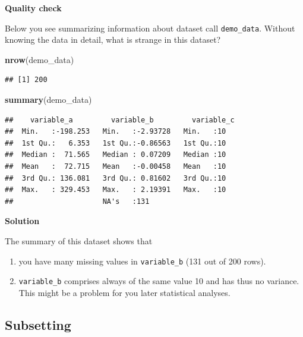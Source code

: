 \documentclass[
]{scrartcl}
\makeatletter
\newenvironment{Shaded}{\begin{snugshade}}{\end{snugshade}}
\newcommand{\FunctionTok}[1]{\textcolor[rgb]{0.13,0.29,0.53}{\textbf{#1}}}
\newcommand{\NormalTok}[1]{#1}
\providecommand{\tightlist}{%
  \setlength{\itemsep}{0pt}\setlength{\parskip}{0pt}}
\newenvironment{kframe}{%
\medskip{}
\setlength{\fboxsep}{.8em}
 \def\at@end@of@kframe{}%
 \ifinner\ifhmode%
  \def\at@end@of@kframe{\end{minipage}}%
  \begin{minipage}{\columnwidth}%
 \fi\fi%
 \def\FrameCommand##1{\hskip\@totalleftmargin \hskip-\fboxsep
 \colorbox{shadecolor}{##1}\hskip-\fboxsep
     \hskip-\linewidth \hskip-\@totalleftmargin \hskip\columnwidth}%
 \MakeFramed {\advance\hsize-\width
   \@totalleftmargin\z@ \linewidth\hsize
   \@setminipage}}%
 {\par\unskip\endMakeFramed%
 \at@end@of@kframe}
\newenvironment{rmdblock}[1]
  {
  \begin{itemize}
  \renewcommand{\labelitemi}{
    \raisebox{-.7\height}[0pt][0pt]{
      {\setkeys{Gin}{width=3em,keepaspectratio}\texttt{[image: images/\#1]}}
    }
  }
  \setlength{\fboxsep}{1em}
  \begin{kframe}
  \item
  }
  {
  \end{kframe}
  \end{itemize}
  }
\newenvironment{myexercise}
    {\begin{rmdblock}{exercise_green}}
    {\end{rmdblock}}
\newenvironment{webexsolution}[1]
    {\par\tiny\textbf{#1}}
    {\par}
\newcommand{\webexhide}[1]{\begin{webexsolution}{#1}}
\newcommand{\webexunhide}{\end{webexsolution}}
\makeatother
\begin{document}
\begin{myexercise}
\textbf{Quality check}

Below you see summarizing information about dataset call
\texttt{demo\_data}. Without knowing the data in detail, what is strange
in this dataset?
\end{myexercise}

\begin{Shaded}
\begin{Highlighting}[]
\FunctionTok{nrow}\NormalTok{(demo\_data)}
\end{Highlighting}
\end{Shaded}

\begin{verbatim}
## [1] 200
\end{verbatim}

\begin{Shaded}
\begin{Highlighting}[]
\FunctionTok{summary}\NormalTok{(demo\_data)}
\end{Highlighting}
\end{Shaded}

\begin{verbatim}
##    variable_a         variable_b         variable_c
##  Min.   :-198.253   Min.   :-2.93728   Min.   :10  
##  1st Qu.:   6.353   1st Qu.:-0.86563   1st Qu.:10  
##  Median :  71.565   Median : 0.07209   Median :10  
##  Mean   :  72.715   Mean   :-0.00458   Mean   :10  
##  3rd Qu.: 136.081   3rd Qu.: 0.81602   3rd Qu.:10  
##  Max.   : 329.453   Max.   : 2.19391   Max.   :10  
##                     NA's   :131
\end{verbatim}

\webexhide{Solution}

The summary of this dataset shows that

\begin{enumerate}
\def\labelenumi{\arabic{enumi}.}
\tightlist
\item
  you have many missing values in \texttt{variable\_b} (131 out of 200 rows).
\item
  \texttt{variable\_b} comprises always of the same value 10 and has thus no variance. This might be a problem for you later statistical analyses.
\end{enumerate}

\webexunhide

\hypertarget{nolabel}{%
\subsection{Subsetting}\label{nolabel}}
\end{document}
